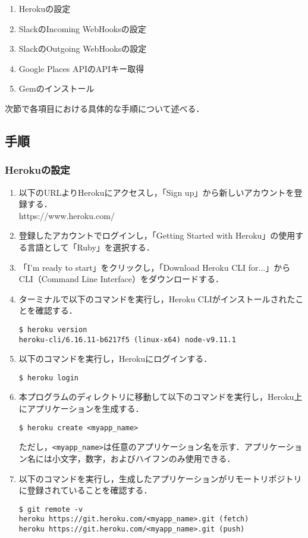 \documentclass[12pt]{jsarticle}
\begin{document}
\begin{enumerate}
\item Herokuの設定
\item SlackのIncoming WebHooksの設定
\item SlackのOutgoing WebHooksの設定
\item Google Places APIのAPIキー取得
\item Gemのインストール
\end{enumerate}
次節で各項目における具体的な手順について述べる．

\subsection{手順}
\subsubsection{Herokuの設定}
\begin{enumerate}
\item 以下のURLよりHerokuにアクセスし，「Sign up」から新しいアカウントを登録する．\\
https://www.heroku.com/

\item 登録したアカウントでログインし，「Getting Started with Heroku」の使用する言語として「Ruby」を選択する．

\item 「I'm ready to start」をクリックし，「Download Heroku CLI for...」からCLI（Command Line Interface）をダウンロードする．

\item ターミナルで以下のコマンドを実行し，Heroku CLIがインストールされたことを確認する．
\begin{verbatim}
$ heroku version
heroku-cli/6.16.11-b6217f5 (linux-x64) node-v9.11.1
\end{verbatim}

\item 以下のコマンドを実行し，Herokuにログインする．
\begin{verbatim}
$ heroku login
\end{verbatim}

\item 本プログラムのディレクトリに移動して以下のコマンドを実行し，Heroku上にアプリケーションを生成する．
\begin{verbatim}
$ heroku create <myapp_name>
\end{verbatim}
ただし，\verb|<myapp_name>|は任意のアプリケーション名を示す．アプリケーション名には小文字，数字，およびハイフンのみ使用できる．

\item 以下のコマンドを実行し，生成したアプリケーションがリモートリポジトリに登録されていることを確認する．
\begin{verbatim}
$ git remote -v
heroku https://git.heroku.com/<myapp_name>.git (fetch)
heroku https://git.heroku.com/<myapp_name>.git (push)
\end{verbatim}
\end{enumerate}
\end{document}

